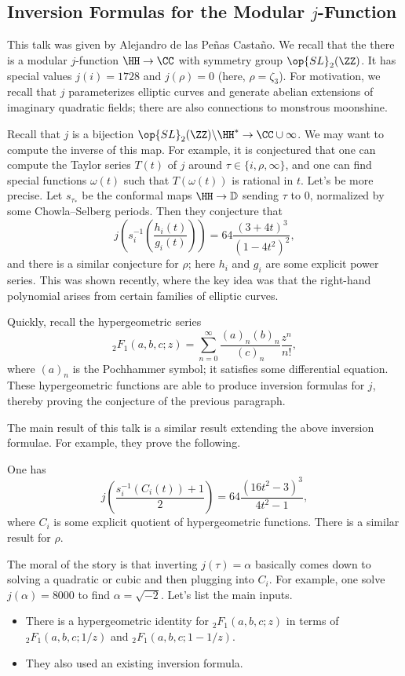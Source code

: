 \documentclass{article}
\begin{document}
\subsection{Inversion Formulas for the Modular \texorpdfstring{$j$}{j}-Function}
This talk was given by Alejandro de las Pe\~nas Casta\~no. We recall that the there is a modular $j$-function $\HH\to\CC$ with symmetry group $\op{SL}_2(\ZZ)$. It has special values $j(i)=1728$ and $j(\rho)=0$ (here, $\rho=\zeta_3$). For motivation, we recall that $j$ parameterizes elliptic curves and generate abelian extensions of imaginary quadratic fields; there are also connections to monstrous moonshine.

Recall that $j$ is a bijection $\op{SL}_2(\ZZ)\backslash\HH^*\to\CC\cup\infty$. We may want to compute the inverse of this map. For example, it is conjectured that one can compute the Taylor series $T(t)$ of $j$ around $\tau\in\{i,\rho,\infty\}$, and one can find special functions $\omega(t)$ such that $T(\omega(t))$ is rational in $t$. Let's be more precise. Let $s_{\tau_*}$ be the conformal maps $\HH\to\mathbb D$ sending $\tau$ to $0$, normalized by some Chowla--Selberg periods. Then they conjecture that
\[j\left(s_i^{-1}\left(\frac{h_i(t)}{g_i(t)}\right)\right)=64\frac{(3+4t)^3}{(1-4t^2)^2},\]
and there is a similar conjecture for $\rho$; here $h_i$ and $g_i$ are some explicit power series. This was shown recently, where the key idea was that the right-hand polynomial arises from certain families of elliptic curves.

Quickly, recall the hypergeometric series
\[_2F_1(a,b,c;z)=\sum_{n=0}^\infty\frac{(a)_n(b)_n}{(c)_n}\frac{z^n}{n!},\]
where $(a)_n$ is the Pochhammer symbol; it satisfies some differential equation. These hypergeometric functions are able to produce inversion formulas for $j$, thereby proving the conjecture of the previous paragraph.

The main result of this talk is a similar result extending the above inversion formulae. For example, they prove the following.
\begin{theorem}
	One has
	\[j\left(\frac{s_i^{-1}(C_i(t))+1}2\right)=64\frac{(16t^2-3)^3}{4t^2-1},\]
	where $C_i$ is some explicit quotient of hypergeometric functions. There is a similar result for $\rho$.
\end{theorem}
The moral of the story is that inverting $j(\tau)=\alpha$ basically comes down to solving a quadratic or cubic and then plugging into $C_i$. For example, one solve $j(\alpha)=8000$ to find $\alpha=\sqrt{-2}$. Let's list the main inputs.
\begin{itemize}
	\item There is a hypergeometric identity for $_2F_1(a,b,c;z)$ in terms of $_2F_1(a,b,c;1/z)$ and $_2F_1(a,b,c;1-1/z)$.
	\item They also used an existing inversion formula.
\end{itemize}
\end{document}
